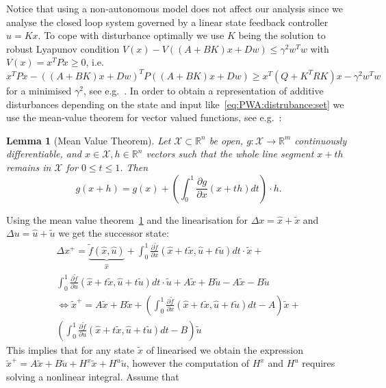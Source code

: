 \documentclass[letterpaper, 10pt, conference]{ieeeconf} %
\newtheorem{thm}{Lemma}[section]
\begin{document}
Notice that using a non-autonomous model does not affect our analysis since we analyse the closed loop system
governed by a linear state feedback controller $u=Kx$. To cope with disturbance optimally we use $K$ 
being the solution to robust Lyapunov condition $V(x)-V((A+BK)x+Dw)\leq \gamma^2w^Tw$ with $V(x)=x^T P x\geq0$, i.e.
$x^TPx - ((A+BK)x+Dw)^TP((A+BK)x+Dw)\geq x^T(Q+K^TRK)x -\gamma^2 w^Tw$ for a minimised $\gamma^2$, 
see e.g.~\cite{Boyd:94}.
In order to obtain a 
representation of additive disturbances depending on the state and input like~\eqref{eq:PWA:distrubance:set}
we use the mean-value theorem for vector valued functions, see e.g.~\cite{Apostol:1974}:
%
%
\begin{thm}[Mean Value Theorem]\label{thm:mean:value:theorem}
Let $\mathcal X\subset\mathbb R^n$ be open, $g : \mathcal X \rightarrow\mathbb R^m$ continuously differentiable, 
and $x \in\mathcal X, h \in\mathbb R^n$ vectors such that the 
whole line segment $x + th$ remains in $\mathcal X$ for $0 \leq t \leq 1$. Then
\begin{equation}
	g(x+h) = g(x) + \left(\int_0^1 \frac{\partial g}{\partial x}(x+th)dt\right)\cdot h.
\end{equation}
\end{thm}
%
%
Using the mean value theorem~\ref{thm:mean:value:theorem}
and the linearisation for $\Delta x = \hat x + \tilde x$ and $\Delta u = \hat u + \tilde u$ we
get the successor state:
%
\begin{equation}
	\begin{split}
	\Delta x^+ = \underbrace{\tilde f(\hat x, \hat u)}_{\hat x} + \int_0^1\frac{\partial\tilde 
	f}{\partial x}(\hat x + t\tilde x
	,\hat u + t\tilde u)dt\cdot \tilde x +\\
	 \int_0^1\frac{\partial\tilde f}{\partial u}(\hat x + t\tilde x
	,\hat u + t\tilde u)dt\cdot \tilde u + A \tilde x + B \tilde u - A \tilde x - B\tilde u\\
	\Leftrightarrow \tilde x^+ = A\tilde x + B \tilde x +\left(
	\int_0^1\frac{\partial\tilde f}{\partial x}(\hat x + t\tilde x,\hat u + t\tilde u)dt - A
	\right)\tilde x + \\ \left(
	\int_0^1\frac{\partial\tilde f}{\partial u}(\hat x + t\tilde x,\hat u + t\tilde u)dt - B
	\right)\tilde u
	\end{split}
\end{equation}
%
This implies that for any state $\tilde x$ of linearised we obtain the expression
$\tilde x^+ = A\tilde x+B\tilde u + H^x\tilde x + H^u \tilde u$, however the computation
of $H^x$ and $H^u$ requires solving a nonlinear integral. Assume that
\end{document}
